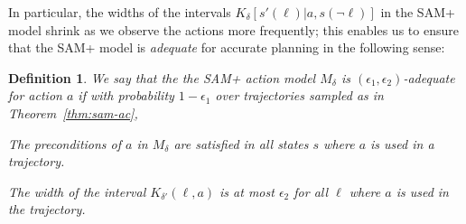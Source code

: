 \documentclass[letterpaper]{article} %
\newtheorem{definition}{Definition}
\begin{document}
In particular, the widths of the intervals $K_\delta[s'(\ell)|a,s(\neg\ell)]$ in the SAM+ model shrink as we observe the actions more frequently; this enables us to ensure that the SAM+ model is \emph{adequate} for accurate planning in the following sense:

\begin{definition}
We say that the the SAM+ action model $M_\delta$ is \emph{$(\epsilon_1,\epsilon_2)$-adequate} for action $a$ if with probability $1-\epsilon_1$ over trajectories sampled as in Theorem~\ref{thm:sam-ac},
\begin{compactenum}
\item The preconditions of $a$ in $M_\delta$ are satisfied in all states $s$ where $a$ is used in a trajectory.
\item The width of the interval $K_{\delta'}(\ell,a)$ is at most $\epsilon_2$ for all $\ell$ where $a$ is used in the trajectory.
\end{compactenum}
\end{definition}
\end{document}
